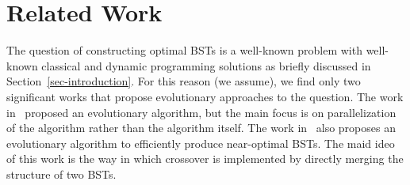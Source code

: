 
\section{Related Work}
\label{sec-relatedwork}

The question of constructing optimal BSTs is a well-known problem with well-known classical and dynamic programming solutions as briefly discussed in Section~\ref{sec-introduction}. For this reason (we assume), we find only two significant works that propose evolutionary approaches to the question. The work in~\cite{zamanifar2007designing} proposed an evolutionary algorithm, but the main focus is on parallelization of the algorithm rather than the algorithm itself. The work in~\cite{fatemi2007new} also proposes an evolutionary algorithm to efficiently produce near-optimal BSTs. The maid ideo of this work is the way in which crossover is implemented by directly merging the structure of two BSTs.
